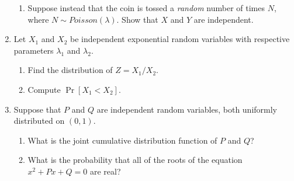 \documentclass[11pt,letterpaper]{article}
\begin{document}
\begin{enumerate}
\begin{enumerate}
        \item Suppose instead that the coin is tossed a \emph{random} number of times $N$, where $N\sim Poisson(\lambda)$.
        Show that $X$ and $Y$ are independent.
    \end{enumerate}

    \item Let $X_1$ and $X_2$ be independent exponential random variables with respective parameters $\lambda_1$ and $\lambda_2$.
    \begin{enumerate}
        \item Find the distribution of $Z=X_1/X_2$.
        \item Compute $\Pr[X_1<X_2]$.
    \end{enumerate}


    \item Suppose that $P$ and $Q$ are independent random variables, both uniformly distributed on $(0,1)$.
    \begin{enumerate}
        \item What is the joint cumulative distribution function of $P$ and $Q$?

        \item What is the probability that all of the roots of the equation $x^2 + Px+Q = 0$ are real?
    \end{enumerate}

\end{enumerate}
\end{document}
